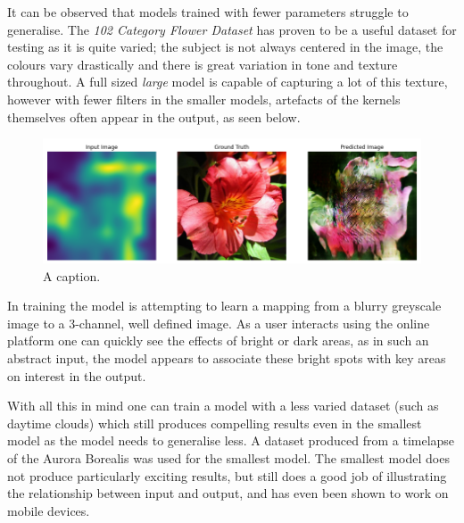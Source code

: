 \documentclass{article}
\begin{document}
It can be observed that models trained with fewer parameters struggle to generalise. The \textit{102 Category Flower Dataset}\cite{flowers_dataset} has proven to be a useful dataset for testing as it is quite varied; the subject is not always centered in the image, the colours vary drastically and there is great variation in tone and texture throughout. A full sized \textit{large} model is capable of capturing a lot of this texture, however with fewer filters in the smaller models, artefacts of the kernels themselves often appear in the output, as seen below.

\begin{figure}[h]
	\centering
	\includegraphics[scale=0.4]{artefacts}
	\caption{A caption.}
\end{figure}

In training the model is attempting to learn a mapping from a blurry greyscale image to a 3-channel, well defined image. As a user interacts using the online platform one can quickly see the effects of bright or dark areas, as in such an abstract input, the model appears to associate these bright spots with key areas on interest in the output.

With all this in mind one can train a model with a less varied dataset (such as daytime clouds) which still produces compelling results even in the smallest model as the model needs to generalise less. A dataset produced from a timelapse of the Aurora Borealis was used for the smallest model. The smallest model does not produce particularly exciting results, but still does a good job of illustrating the relationship between input and output, and has even been shown to work on mobile devices.

\end{document}

